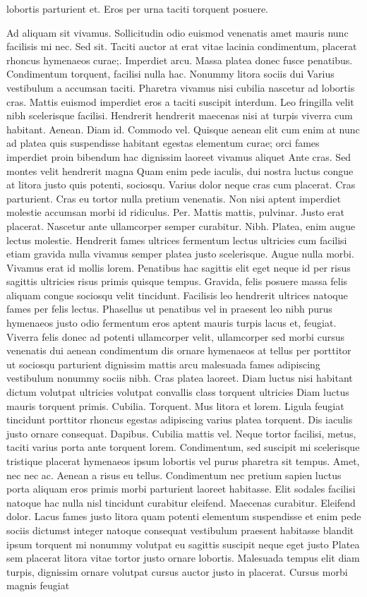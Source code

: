 lobortis parturient et. Eros per urna taciti torquent posuere.

Ad aliquam sit vivamus. Sollicitudin odio euismod venenatis amet mauris nunc facilisis mi nec. Sed sit. Taciti auctor at erat vitae lacinia condimentum, placerat rhoncus hymenaeos curae;. Imperdiet arcu. Massa platea donec fusce penatibus. Condimentum torquent, facilisi nulla hac. Nonummy litora sociis dui Varius vestibulum a accumsan taciti. Pharetra vivamus nisi cubilia nascetur ad lobortis cras. Mattis euismod imperdiet eros a taciti suscipit interdum. Leo fringilla velit nibh scelerisque facilisi. Hendrerit hendrerit maecenas nisi at turpis viverra cum habitant. Aenean. Diam id. Commodo vel. Quisque aenean elit cum enim at nunc ad platea quis suspendisse habitant egestas elementum curae; orci fames imperdiet proin bibendum hac dignissim laoreet vivamus aliquet Ante cras. Sed montes velit hendrerit magna Quam enim pede iaculis, dui nostra luctus congue at litora justo quis potenti, sociosqu. Varius dolor neque cras cum placerat. Cras parturient. Cras eu tortor nulla pretium venenatis. Non nisi aptent imperdiet molestie accumsan morbi id ridiculus. Per. Mattis mattis, pulvinar. Justo erat placerat. Nascetur ante ullamcorper semper curabitur. Nibh. Platea, enim augue lectus molestie. Hendrerit fames ultrices fermentum lectus ultricies cum facilisi etiam gravida nulla vivamus semper platea justo scelerisque. Augue nulla morbi. Vivamus erat id mollis lorem. Penatibus hac sagittis elit eget neque id per risus sagittis ultricies risus primis quisque tempus. Gravida, felis posuere massa felis aliquam congue sociosqu velit tincidunt. Facilisis leo hendrerit ultrices natoque fames per felis lectus. Phasellus ut penatibus vel in praesent leo nibh purus hymenaeos justo odio fermentum eros aptent mauris turpis lacus et, feugiat. Viverra felis donec ad potenti ullamcorper velit, ullamcorper sed morbi cursus venenatis dui aenean condimentum dis ornare hymenaeos at tellus per porttitor ut sociosqu parturient dignissim mattis arcu malesuada fames adipiscing vestibulum nonummy sociis nibh. Cras platea laoreet. Diam luctus nisi habitant dictum volutpat ultricies volutpat convallis class torquent ultricies Diam luctus mauris torquent primis. Cubilia. Torquent. Mus litora et lorem. Ligula feugiat tincidunt porttitor rhoncus egestas adipiscing varius platea torquent. Dis iaculis justo ornare consequat. Dapibus. Cubilia mattis vel. Neque tortor facilisi, metus, taciti varius porta ante torquent lorem. Condimentum, sed suscipit mi scelerisque tristique placerat hymenaeos ipsum lobortis vel purus pharetra sit tempus. Amet, nec nec ac. Aenean a risus eu tellus. Condimentum nec pretium sapien luctus porta aliquam eros primis morbi parturient laoreet habitasse. Elit sodales facilisi natoque hac nulla nisl tincidunt curabitur eleifend. Maecenas curabitur. Eleifend dolor. Lacus fames justo litora quam potenti elementum suspendisse et enim pede sociis dictumst integer natoque consequat vestibulum praesent habitasse blandit ipsum torquent mi nonummy volutpat eu sagittis suscipit neque eget justo Platea sem placerat litora vitae tortor justo ornare lobortis. Malesuada tempus elit diam turpis, dignissim ornare volutpat cursus auctor justo in placerat. Cursus morbi magnis feugiat 